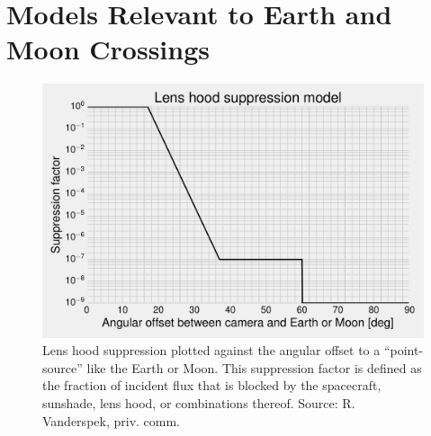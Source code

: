 \section{Models Relevant to Earth and Moon Crossings}
\label{sec:appendix}

\begin{figure}[!h] %
	\centering
	\includegraphics{figures/lens_hood_suppression.pdf}
	\caption{Lens hood suppression plotted against the angular offset to a 
	``point-source'' like the 
	Earth or Moon. This suppression factor is defined as the fraction of 
	incident flux that is blocked by the spacecraft, sunshade, lens hood, or 
	combinations thereof. Source: R. Vanderspek, priv. comm.}
	\label{fig:lens_hood_suppression}
\end{figure}
\newpage

